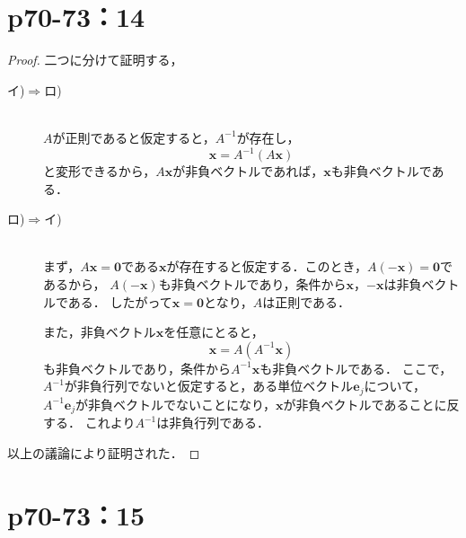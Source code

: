 \documentclass[a4paper,10pt,fleqn]{ltjsarticle}
\begin{document}
\newpage


\section*{p70-73：14}

\begin{leftbar}
    \begin{proof}
        二つに分けて証明する，
        \begin{description}
            \item[イ)$\Longrightarrow$ロ)] \mbox{} \\
                  $A$が正則であると仮定すると，$A^{-1}$が存在し，
                  \[
                      \bm{x} = A^{-1} (A\bm{x})
                  \]
                  と変形できるから，$A \bm{x}$が非負ベクトルであれば，$\bm{x}$も非負ベクトルである．
            \item[ロ)$\Longrightarrow$イ)] \mbox{} \\
                  まず，$ A \bm{x} =\bm{0}$である$\bm{x}$が存在すると仮定する．このとき，$A (-\bm{x}) =\bm{0}$であるから，
                  $A (-\bm{x})$も非負ベクトルであり，条件から$ \bm{x}$，$-\bm{x}$は非負ベクトルである．
                  したがって$\bm{x}=\bm{0}$となり，$A$は正則である．

                  また，非負ベクトル$\bm{x}$を任意にとると，
                  \[
                      \bm{x} = A (A^{-1} \bm{x})
                  \]
                  も非負ベクトルであり，条件から$A^{-1} \bm{x}$も非負ベクトルである．
                  ここで，$A^{-1}$が非負行列でないと仮定すると，ある単位ベクトル$\bm{e}_j$について，
                  $A^{-1} \bm{e}_j $が非負ベクトルでないことになり，$\bm{x}$が非負ベクトルであることに反する．
                  これより$A^{-1}$は非負行列である．
        \end{description}
        以上の議論により証明された．
    \end{proof}
\end{leftbar}


\newpage



\section*{p70-73：15}
\end{document}
